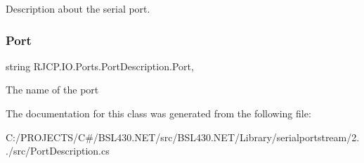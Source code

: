 Description about the serial port. 

\mbox{\label{class_r_j_c_p_1_1_i_o_1_1_ports_1_1_port_description_a8e9afb970a70cea5accb89c66723f4be}} 
\subsubsection{\texorpdfstring{Port}{Port}}
{\footnotesize\ttfamily string R\+J\+C\+P.\+I\+O.\+Ports.\+Port\+Description.\+Port\hspace{0.3cm}{\ttfamily [get]}, {\ttfamily [set]}}



The name of the port 



The documentation for this class was generated from the following file\+:\begin{DoxyCompactItemize}
\item 
C\+:/\+P\+R\+O\+J\+E\+C\+T\+S/\+C\#/\+B\+S\+L430.\+N\+E\+T/src/\+B\+S\+L430.\+N\+E\+T/\+Library/serialportstream/2../src/Port\+Description.\+cs\end{DoxyCompactItemize}
